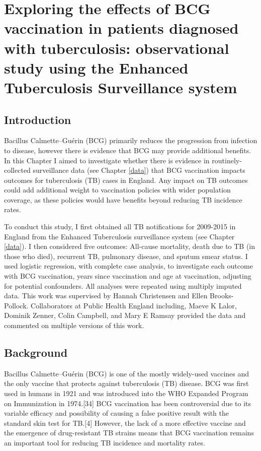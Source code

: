 \documentclass[11pt,twoside]{bristolthesis}
\begin{document}
  \hypertarget{benefical-bcg-out}{%
  \chapter{Exploring the effects of BCG vaccination in patients diagnosed with tuberculosis: observational study using the Enhanced Tuberculosis Surveillance system}\label{benefical-bcg-out}}
  
  \hypertarget{introduction-4}{%
  \section{Introduction}\label{introduction-4}}
  
  Bacillus Calmette--Guérin (BCG) primarily reduces the progression from infection to disease, however there is evidence that BCG may provide additional benefits. In this Chapter I aimed to investigate whether there is evidence in routinely-collected surveillance data (see Chapter \ref{data}) that BCG vaccination impacts outcomes for tuberculosis (TB) cases in England. Any impact on TB outcomes could add additional weight to vaccination policies with wider population coverage, as these policies would have benefits beyond reducing TB incidence rates.
  
  To conduct this study, I first obtained all TB notifications for 2009-2015 in England from the Enhanced Tuberculosis surveillance system (see Chapter \ref{data}). I then considered five outcomes: All-cause mortality, death due to TB (in those who died), recurrent TB, pulmonary disease, and sputum smear status. I used logistic regression, with complete case analysis, to investigate each outcome with BCG vaccination, years since vaccination and age at vaccination, adjusting for potential confounders. All analyses were repeated using multiply imputed data. This work was supervised by Hannah Christensen and Ellen Brooks-Pollock. Collaborators at Public Health England including, Maeve K Lalor, Dominik Zenner, Colin Campbell, and Mary E Ramsay provided the data and commented on multiple versions of this work.
  
  \hypertarget{background-4}{%
  \section{Background}\label{background-4}}
  
  Bacillus Calmette--Guérin (BCG) is one of the mostly widely-used vaccines and the only vaccine that protects against tuberculosis (TB) disease. BCG was first used in humans in 1921 and was introduced into the WHO Expanded Program on Immunization in 1974.{[}34{]} BCG vaccination has been controversial due to its variable efficacy and possibility of causing a false positive result with the standard skin test for TB.{[}4{]} However, the lack of a more effective vaccine and the emergence of drug-resistant TB strains means that BCG vaccination remains an important tool for reducing TB incidence and mortality rates.
  
\end{document}

